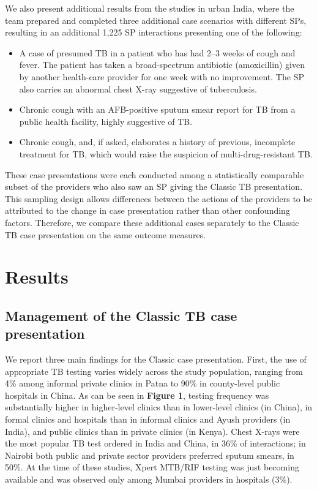 \documentclass[fleqn,10pt]{wlscirep}
\begin{document}
We also present additional results from the studies in urban India, where the team prepared and completed three additional case scenarios with different SPs, resulting in an additional 1,225 SP interactions presenting one of the following:

\begin{itemize}
\item A case of presumed TB in a patient who has had 2–3 weeks of cough and fever. The patient has taken a broad-spectrum antibiotic (amoxicillin) given by another health-care provider for one week with no improvement. The SP also carries an abnormal chest X-ray suggestive of tuberculosis.
\item Chronic cough with an AFB-positive sputum smear report for TB from a public health facility, highly suggestive of TB.
\item Chronic cough, and, if asked, elaborates a history of previous, incomplete treatment for TB, which would raise the suspicion of multi-drug-resistant TB.
\end{itemize}

\noindent These case presentations were each conducted among a statistically comparable subset of the providers who also saw an SP giving the Classic TB presentation. This sampling design allows differences between the actions of the providers to be attributed to the change in case presentation rather than other confounding factors. Therefore, we compare these additional cases separately to the Classic TB case presentation on the same outcome measures.

\section*{Results}

\subsection*{Management of the Classic TB case presentation}

We report three main findings for the Classic case presentation. First, the use of appropriate TB testing varies widely across the study population, ranging from 4\% among informal private clinics in Patna to 90\% in county-level public hospitals in China. As can be seen in \textbf{Figure 1}, testing frequency was substantially higher in higher-level clinics than in lower-level clinics (in China), in formal clinics and hospitals than in informal clinics and Ayush providers (in India), and public clinics than in private clinics (in Kenya). Chest X-rays were the most popular TB test ordered in India and China, in 36\% of interactions; in Nairobi both public and private sector providers preferred sputum smears, in 50\%. At the time of these studies, Xpert MTB/RIF testing was just becoming available and was observed only among Mumbai providers in hospitals (3\%).   
\end{document}
